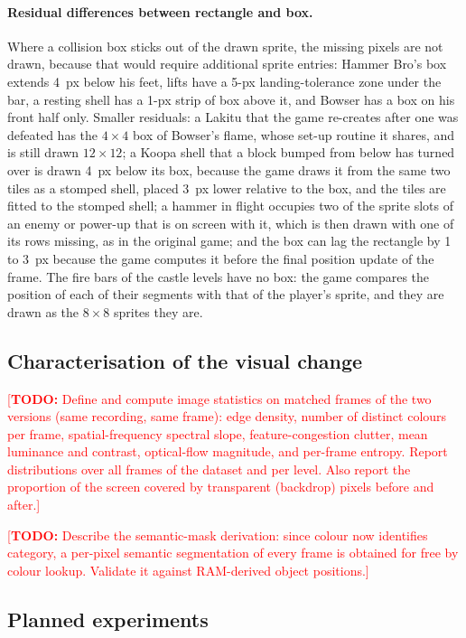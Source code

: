 \documentclass{article}
\newcommand{\TODO}[1]{\textcolor{red}{[\textbf{TODO:} #1]}}
\begin{document}
\paragraph{Residual differences between rectangle and box.} Where a collision box sticks out of
the drawn sprite, the missing pixels are not drawn, because that would require additional sprite
entries: Hammer Bro's box extends 4~px below his feet, lifts have a 5-px landing-tolerance zone
under the bar, a resting shell has a 1-px strip of box above it, and Bowser has a box on his front
half only. Smaller residuals: a Lakitu that the game re-creates after one was defeated has the
$4\times4$ box of Bowser's flame, whose set-up routine it shares, and is still drawn
$12\times12$; a Koopa shell that a block bumped from below has turned over is drawn 4~px below
its box, because the game draws it from the same two tiles as a stomped shell, placed 3~px lower
relative to the box, and the tiles are fitted to the stomped shell; a hammer in flight occupies
two of the sprite slots of an enemy or power-up that is on screen with it, which is then drawn
with one of its rows missing, as in the original game; and the box can lag the rectangle by 1 to
3~px because the game computes it before the final position update of the frame. The fire bars of the castle levels have no box: the game
compares the position of each of their segments with that of the player's sprite, and they are
drawn as the $8\times8$ sprites they are.

\subsection{Characterisation of the visual change}
\label{sec:imagestats}

\TODO{Define and compute image statistics on matched frames of the two versions (same recording,
same frame): edge density, number of distinct colours per frame, spatial-frequency spectral slope,
feature-congestion clutter, mean luminance and contrast, optical-flow magnitude, and per-frame
entropy. Report distributions over all frames of the dataset and per level. Also report the
proportion of the screen covered by transparent (backdrop) pixels before and after.}

\TODO{Describe the semantic-mask derivation: since colour now identifies category, a per-pixel
semantic segmentation of every frame is obtained for free by colour lookup. Validate it against
RAM-derived object positions.}

\subsection{Planned experiments}
\label{sec:planned}
\end{document}
